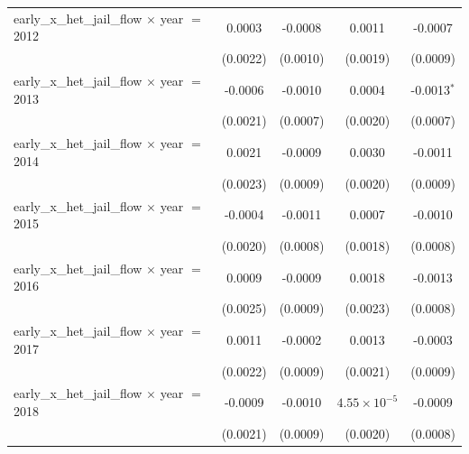 \begin{tabular}{lcccc}
   early\_x\_het\_jail\_flow $\times$ year $=$ 2012      & 0.0003                 & -0.0008                   & 0.0011                 & -0.0007\\   
                                                         & (0.0022)               & (0.0010)                  & (0.0019)               & (0.0009)\\   
   early\_x\_het\_jail\_flow $\times$ year $=$ 2013      & -0.0006                & -0.0010                   & 0.0004                 & -0.0013$^{*}$\\   
                                                         & (0.0021)               & (0.0007)                  & (0.0020)               & (0.0007)\\   
   early\_x\_het\_jail\_flow $\times$ year $=$ 2014      & 0.0021                 & -0.0009                   & 0.0030                 & -0.0011\\   
                                                         & (0.0023)               & (0.0009)                  & (0.0020)               & (0.0009)\\   
   early\_x\_het\_jail\_flow $\times$ year $=$ 2015      & -0.0004                & -0.0011                   & 0.0007                 & -0.0010\\   
                                                         & (0.0020)               & (0.0008)                  & (0.0018)               & (0.0008)\\   
   early\_x\_het\_jail\_flow $\times$ year $=$ 2016      & 0.0009                 & -0.0009                   & 0.0018                 & -0.0013\\   
                                                         & (0.0025)               & (0.0009)                  & (0.0023)               & (0.0008)\\   
   early\_x\_het\_jail\_flow $\times$ year $=$ 2017      & 0.0011                 & -0.0002                   & 0.0013                 & -0.0003\\   
                                                         & (0.0022)               & (0.0009)                  & (0.0021)               & (0.0009)\\   
   early\_x\_het\_jail\_flow $\times$ year $=$ 2018      & -0.0009                & -0.0010                   & $4.55\times 10^{-5}$   & -0.0009\\   
                                                         & (0.0021)               & (0.0009)                  & (0.0020)               & (0.0008)\\   

\end{tabular}
